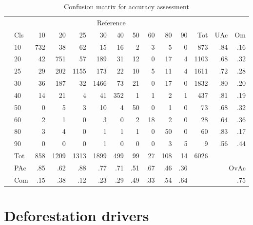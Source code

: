 		\begin{table}[ht]
			\centering
			\caption[Accuracy assessment]{Confusion matrix for accuracy assessment}
			\label{tab:accuracy}
			\begin{tabular}{llrrrrrrrrrrrr}
				\hline
				& & \multicolumn{9}{c}{Reference} & & & \\
				& Cls & 10 & 20 & 25 & 30 & 40 & 50 & 60 & 80 & 90 & Tot & UAc & Om \\\hline
				\multirow{9}{*}{\STAB{\rotatebox[origin=c]{90}{Prediction}}}
				& 10 & 732 & 38 & 62 & 15 & 16 & 2 & 3 & 5 & 0 & 873 & .84 & .16 \\ 
				& 20 & 42 & 751 & 57 & 189 & 31 & 12 & 0 & 17 & 4 & 1103 & .68 & .32 \\ 
				& 25 & 29 & 202 & 1155 & 173 & 22 & 10 & 5 & 11 & 4 & 1611 & .72 & .28 \\ 
				& 30 & 36 & 187 & 32 & 1466 & 73 & 21 & 0 & 17 & 0 & 1832 & .80 & .20 \\ 
				& 40 & 14 & 21 & 4 & 41 & 352 & 1 & 1 & 2 & 1 & 437 & .81 & .19 \\ 
				& 50 & 0 & 5 & 3 & 10 & 4 & 50 & 0 & 1 & 0 & 73 & .68 & .32 \\ 
				& 60 & 2 & 1 & 0 & 3 & 0 & 2 & 18 & 2 & 0 & 28 & .64 & .36 \\ 
				& 80 & 3 & 4 & 0 & 1 & 1 & 1 & 0 & 50 & 0 & 60 & .83 & .17 \\ 
				& 90 & 0 & 0 & 0 & 1 & 0 & 0 & 0 & 3 & 5 & 9 & .56 & .44 \\\hline 
				& Tot & 858 & 1209 & 1313 & 1899 & 499 & 99 & 27 & 108 & 14 & 6026 & & \\
				& PAc & .85 & .62 & .88 & .77 & .71 & .51 & .67 & .46 & .36 & & \multicolumn{2}{r}{OvAc} \\
				& Com & .15 & .38 & .12 & .23 & .29 & .49 & .33 & .54 & .64 & & \multicolumn{2}{r}{.75} \\ \hline
			\end{tabular}
		\end{table}

\newpage

	\section{Deforestation drivers}
	\label{sec:driver}

